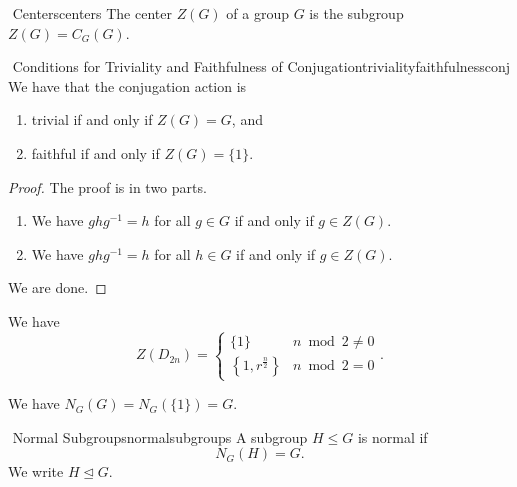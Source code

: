         \begin{definition}{\Stop\,\,Centers}{centers}
            The center \(Z(G)\) of a group \(G\) is the subgroup \(Z(G)=C_G(G)\).
        \end{definition}
        \pagebreak
        \begin{proposition}{\Stop\,\,Conditions for Triviality and Faithfulness of Conjugation}{trivialityfaithfulnessconj}
            We have that the conjugation action is
            \begin{enumerate}
                \item trivial if and only if \(Z(G)=G\), and
                \item faithful if and only if \(Z(G)=\{1\}\).
            \end{enumerate}
            \begin{proof}
                The proof is in two parts.
                \begin{enumerate}
                    \item We have \(ghg^{-1}=h\) for all \(g\in G\) if and only if \(g\in Z(G)\). 
                    \item We have \(ghg^{-1}=h\) for all \(h\in G\) if and only if \(g\in Z(G)\). 
                \end{enumerate}
                We are done.
            \end{proof}
        \end{proposition}
        \begin{example}
            We have
            \begin{equation*}
                Z(D_{2n})=\begin{cases}
                    \{1\} & n\bmod 2\neq0 \\
                    \left\{1,r^\frac{n}{2}\right\} & n\bmod 2=0
                \end{cases}.
            \end{equation*}
        \end{example}
        \begin{example}
            We have \(N_G(G)=N_G(\{1\})=G\).
        \end{example}
        \begin{definition}{\Stop\,\,Normal Subgroups}{normalsubgroups}
            A subgroup \(H\leq G\) is normal if
            \begin{equation*}
                N_G(H)=G.
            \end{equation*}
            We write \(H\trianglelefteq G\).
        \end{definition}
